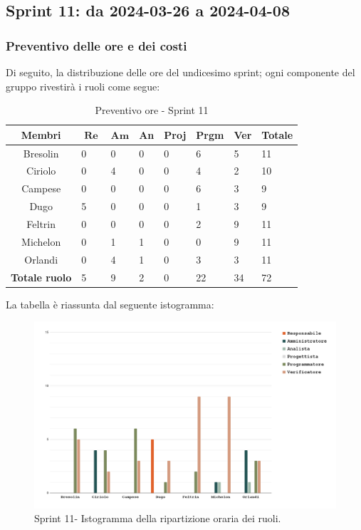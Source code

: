 \documentclass[10pt, a4paper]{article}
\begin{document}

\subsection{Sprint 11: da 2024-03-26 a 2024-04-08}

\subsubsection{Preventivo delle ore e dei costi}
Di seguito, la distribuzione delle ore del undicesimo sprint; ogni componente del gruppo rivestirà i ruoli come segue:
\begin{table}[H]
\begin{tabularx}{\textwidth}{c|X|X|X|X|X|X|X}
\textbf{Membri} & $\operatorname{\textbf{Re}}$ & $\mathrm{\textbf{Am}}$ & \textbf{An} & \textbf{Proj} & \textbf{Prgm} & \textbf{Ver} & \textbf{Totale} \\
\hline Bresolin & 0 & 0 & 0 & 0 & \cellcolor{primarycolor}6 & 5 & 11 \\
\hline Ciriolo & 0 & \cellcolor{primarycolor}4 & 0 & 0 & 4 & 2 & 10 \\
\hline Campese & 0 & 0 & 0 & 0 & \cellcolor{primarycolor}6 & 3 & 9 \\
\hline Dugo & \cellcolor{primarycolor}5 & 0 & 0 & 0 & 1 & 3 & 9 \\
\hline Feltrin & 0 & 0 & 0 & 0 & 2 & \cellcolor{primarycolor}9 & 11 \\
\hline Michelon & 0 & 1 & 1 & 0 & 0 & \cellcolor{primarycolor}9 & 11 \\
\hline Orlandi & 0 & 4 & 1 & 0 & \cellcolor{primarycolor}3 & 3 & 11 \\
\hline
\textbf{Totale ruolo} & 5 & 9 & 2 & 0 & 22 & 34 & 72
\end{tabularx}
\caption{Preventivo ore - Sprint 11}
\end{table}

La tabella è riassunta dal seguente istogramma:
 \begin{figure}[H]
        \centering        
        \includegraphics[width=15.5cm]{istogrammi/istogramma_11_periodo.png}
        \caption{Sprint 11- Istogramma della ripartizione oraria dei ruoli. }
    \end{figure}
\end{document}
